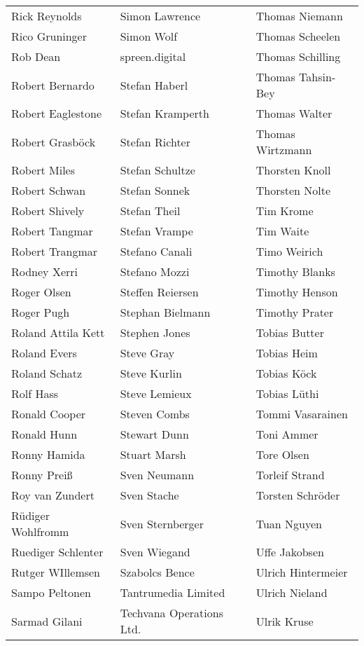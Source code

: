 \begin{tabular}{p{4.5cm}p{4.5cm}p{4.5cm}}
Rick Reynolds & Simon Lawrence & Thomas Niemann \\
Rico Gruninger & Simon Wolf & Thomas Scheelen \\
Rob Dean & spreen.digital & Thomas Schilling \\
Robert Bernardo & Stefan Haberl & Thomas Tahsin-Bey \\
Robert Eaglestone & Stefan Kramperth & Thomas Walter \\
Robert Grasböck & Stefan Richter & Thomas Wirtzmann \\
Robert Miles & Stefan Schultze & Thorsten Knoll \\
Robert Schwan & Stefan Sonnek & Thorsten Nolte \\
Robert Shively & Stefan Theil & Tim Krome \\
Robert Tangmar & Stefan Vrampe & Tim Waite \\
Robert Trangmar & Stefano Canali & Timo Weirich \\
Rodney Xerri & Stefano Mozzi & Timothy Blanks \\
Roger Olsen & Steffen Reiersen & Timothy Henson \\
Roger Pugh & Stephan Bielmann & Timothy Prater \\
Roland Attila Kett & Stephen Jones & Tobias Butter \\
Roland Evers & Steve Gray & Tobias Heim \\
Roland Schatz & Steve Kurlin & Tobias Köck \\
Rolf Hass & Steve Lemieux & Tobias Lüthi \\
Ronald Cooper & Steven Combs & Tommi Vasarainen \\
Ronald Hunn & Stewart Dunn & Toni Ammer \\
Ronny Hamida & Stuart Marsh & Tore Olsen \\
Ronny Preiß & Sven Neumann & Torleif Strand \\
Roy van Zundert & Sven Stache & Torsten Schröder \\
Rüdiger Wohlfromm & Sven Sternberger & Tuan Nguyen \\
Ruediger Schlenter & Sven Wiegand & Uffe Jakobsen \\
Rutger WIllemsen & Szabolcs Bence & Ulrich Hintermeier \\
Sampo Peltonen & Tantrumedia Limited & Ulrich Nieland \\
Sarmad Gilani & Techvana Operations Ltd. & Ulrik Kruse \\

\end{tabular}

